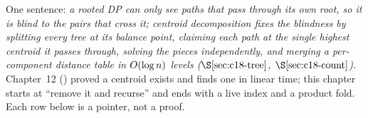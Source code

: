 

One sentence: \emph{a rooted DP can only see paths that pass through its own
root, so it is blind to the pairs that cross it; centroid decomposition fixes the
blindness by splitting every tree at its \emph{balance point}, claiming each path
at the single highest centroid it passes through, solving the pieces independently,
and merging a per-component distance table in \(O(\log n)\) levels
(\(\secref{c18-tree}\), \(\secref{c18-count}\)).} Chapter~12 () proved a
centroid exists and finds one in linear time; this chapter starts at ``remove it
and recurse'' and ends with a live index and a product fold. Each row below is a
pointer, not a proof.

